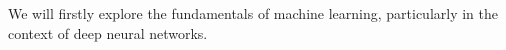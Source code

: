 We will firstly explore the fundamentals of machine learning, particularly in the context of deep neural networks. 